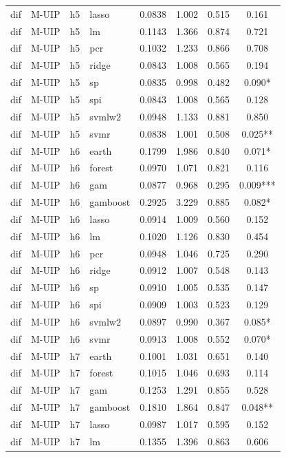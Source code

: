 \begin{ThreePartTable}
\begin{longtable}[t]{llclcccc}
dif & M-UIP & h5 & lasso & 0.0838 & 1.002 & 0.515 & 0.161\\
dif & M-UIP & h5 & lm & 0.1143 & 1.366 & 0.874 & 0.721\\
dif & M-UIP & h5 & pcr & 0.1032 & 1.233 & 0.866 & 0.708\\
dif & M-UIP & h5 & ridge & 0.0843 & 1.008 & 0.565 & 0.194\\
dif & M-UIP & h5 & sp & 0.0835 & 0.998 & 0.482 & 0.090*\\
dif & M-UIP & h5 & spi & 0.0843 & 1.008 & 0.565 & 0.128\\
dif & M-UIP & h5 & svmlw2 & 0.0948 & 1.133 & 0.881 & 0.850\\
dif & M-UIP & h5 & svmr & 0.0838 & 1.001 & 0.508 & 0.025**\\
\addlinespace
dif & M-UIP & h6 & earth & 0.1799 & 1.986 & 0.840 & 0.071*\\
dif & M-UIP & h6 & forest & 0.0970 & 1.071 & 0.821 & 0.116\\
dif & M-UIP & h6 & gam & 0.0877 & 0.968 & 0.295 & 0.009***\\
dif & M-UIP & h6 & gamboost & 0.2925 & 3.229 & 0.885 & 0.082*\\
dif & M-UIP & h6 & lasso & 0.0914 & 1.009 & 0.560 & 0.152\\
dif & M-UIP & h6 & lm & 0.1020 & 1.126 & 0.830 & 0.454\\
dif & M-UIP & h6 & pcr & 0.0948 & 1.046 & 0.725 & 0.290\\
dif & M-UIP & h6 & ridge & 0.0912 & 1.007 & 0.548 & 0.143\\
dif & M-UIP & h6 & sp & 0.0910 & 1.005 & 0.535 & 0.147\\
dif & M-UIP & h6 & spi & 0.0909 & 1.003 & 0.523 & 0.129\\
dif & M-UIP & h6 & svmlw2 & 0.0897 & 0.990 & 0.367 & 0.085*\\
dif & M-UIP & h6 & svmr & 0.0913 & 1.008 & 0.552 & 0.070*\\
\addlinespace
dif & M-UIP & h7 & earth & 0.1001 & 1.031 & 0.651 & 0.140\\
dif & M-UIP & h7 & forest & 0.1015 & 1.046 & 0.693 & 0.114\\
dif & M-UIP & h7 & gam & 0.1253 & 1.291 & 0.855 & 0.528\\
dif & M-UIP & h7 & gamboost & 0.1810 & 1.864 & 0.847 & 0.048**\\
dif & M-UIP & h7 & lasso & 0.0987 & 1.017 & 0.595 & 0.152\\
dif & M-UIP & h7 & lm & 0.1355 & 1.396 & 0.863 & 0.606\\

\end{longtable}
\end{ThreePartTable}
